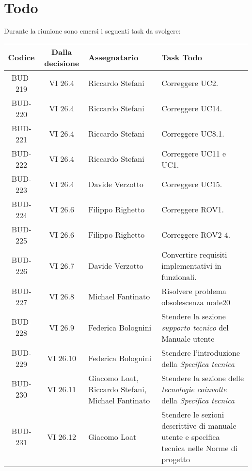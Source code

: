 
\section{Todo}

Durante la riunione sono emersi i seguenti task da svolgere:

\vspace{0.5cm}

\begin{table}[htbp]
\centering
{}
\begin{tabular}{|c|c|p{}|p{}|}
    \hline
    \rowcolor[gray]{0.75}
    \textbf{Codice} & \textbf{Dalla decisione} & \textbf{Assegnatario} & \textbf{Task Todo} \\
    \hline
    BUD-219 & VI 26.4 & Riccardo Stefani & Correggere UC2. \\
    \hline
    BUD-220 & VI 26.4 & Riccardo Stefani & Correggere UC14. \\
    \hline
    BUD-221 & VI 26.4 & Riccardo Stefani & Correggere UC8.1. \\
    \hline
    BUD-222 & VI 26.4 & Riccardo Stefani & Correggere UC11 e UC1. \\
    \hline
    BUD-223 & VI 26.4 & Davide Verzotto & Correggere UC15. \\
    \hline
    BUD-224 & VI 26.6 & Filippo Righetto & Correggere ROV1. \\
    \hline
    BUD-225 & VI 26.6 & Filippo Righetto & Correggere ROV2-4. \\
    \hline
    BUD-226 & VI 26.7 & Davide Verzotto & Convertire requisiti implementativi in funzionali. \\
    \hline
    BUD-227 & VI 26.8 & Michael Fantinato & Risolvere problema obsolescenza node20 \\
    \hline
    BUD-228 & VI 26.9 & Federica Bolognini & Stendere la sezione \emph{supporto tecnico}  del Manuale utente \\
    \hline
    BUD-229 & VI 26.10 & Federica Bolognini & Stendere l'introduzione  della \emph{Specifica tecnica} \\
    \hline
    BUD-230 & VI 26.11 & Giacomo Loat, Riccardo Stefani, Michael Fantinato & Stendere la sezione delle \emph{tecnologie coinvolte}  della \emph{Specifica tecnica} \\
    \hline
    BUD-231 & VI 26.12 & Giacomo Loat & Stendere le sezioni descrittive di manuale utente e specifica tecnica nelle Norme di progetto \\

\end{tabular}
\end{table}
